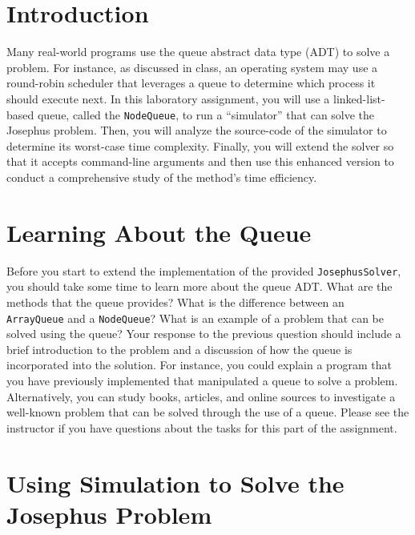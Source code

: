 


\usepackage[compact]{titlesec}


\section*{Introduction}

  Many real-world programs use the queue abstract data type (ADT) to solve a problem.  For instance, as discussed in
  class, an operating system may use a round-robin scheduler that leverages a queue to determine which process it should
  execute next. In this laboratory assignment, you will use a linked-list-based queue, called the {\tt NodeQueue}, to
  run a ``simulator'' that can solve the Josephus problem. Then, you will analyze the source-code of the simulator to
  determine its worst-case time complexity.  Finally, you will extend the solver so that it accepts command-line
  arguments and then use this enhanced version to conduct a comprehensive study of the method's time efficiency.

\section*{Learning About the Queue}

  Before you start to extend the implementation of the provided {\tt JosephusSolver}, you should take some time to learn
  more about the queue ADT.  What are the methods that the queue provides?  What is the difference between an {\tt
    ArrayQueue} and a {\tt NodeQueue}? What is an example of a problem that can be solved using the queue? Your response
  to the previous question should include a brief introduction to the problem and a discussion of how the queue is
  incorporated into the solution. For instance, you could explain a program that you have previously implemented that
  manipulated a queue to solve a problem.  Alternatively, you can study books, articles, and online sources to
  investigate a well-known problem that can be solved through the use of a queue.  Please see the instructor if you have
  questions about the tasks for this part of the assignment.

\section*{Using Simulation to Solve the Josephus Problem}

